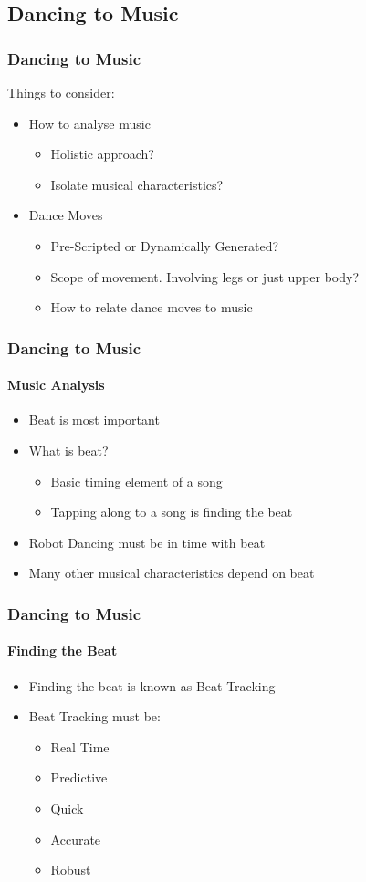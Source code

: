\documentclass{beamer}
\begin{document}
	\subsection{Dancing to Music} %
	\begin{frame}
		\frametitle{Dancing to Music}
		Things to consider:
		\begin{itemize}
			\item How to analyse music
			\begin{itemize}
				\item Holistic approach?
				\item Isolate musical characteristics?
			\end{itemize}
			\item Dance Moves
			\begin{itemize}
				\item Pre-Scripted or Dynamically Generated?
				\item Scope of movement. Involving legs or just upper body?
				\item How to relate dance moves to music
			\end{itemize}
		\end{itemize}
	\end{frame}	
	\begin{frame}
		\frametitle{Dancing to Music}
		\framesubtitle{Music Analysis}
		\begin{itemize}
			\item Beat is most important
			\item What is beat?
			\begin{itemize}
				\item Basic timing element of a song
				\item Tapping along to a song is finding the beat
			\end{itemize}
			\item Robot Dancing must be in time with beat
			\item Many other musical characteristics depend on beat
		\end{itemize}
	\end{frame}	
	\begin{frame}
		\frametitle{Dancing to Music}
		\framesubtitle{Finding the Beat}
		\begin{itemize}
			\item Finding the beat is known as Beat Tracking
			\item Beat Tracking must be:
			\begin{itemize}
				\item Real Time
				\item Predictive
				\item Quick
				\item Accurate
				\item Robust
			\end{itemize}
		\end{itemize}
	\end{frame}	
\end{document}

